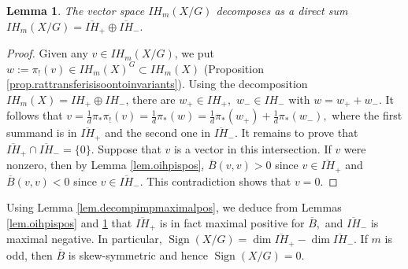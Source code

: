 \documentclass{amsart}
\newtheorem{lemma}[thm]{Lemma}
\theoremstyle{definition}
\theoremstyle{remark}
\newcommand {\Sign}    {{\ensuremath{\operatorname{Sign}}}}
\begin{document}
\begin{lemma} \label{lem.ihxmodgdecompoihpoihn}
The vector space $IH_m (X/G)$ decomposes as a direct sum
$IH_m (X/G) = \overline{IH}_+ \oplus \overline{IH}_-.$
\end{lemma}
\begin{proof}
Given any $v\in IH_m (X/G)$, we put
$w:= \pi_! (v) \in IH_m (X)^G \subset IH_m (X)$
(Proposition \ref{prop.rattransferisisoontoinvariants}).
Using the decomposition $IH_m (X) = IH_+ \oplus IH_-$,
there are $w_+ \in IH_+,$ $w_- \in IH_-$ with $w = w_+ + w_-$.
It follows that
$v = \frac{1}{d} \pi_* \pi_! (v)
     = \frac{1}{d} \pi_* (w)
     = \frac{1}{d} \pi_* (w_+) +  \frac{1}{d} \pi_* (w_-),$
where the first summand is in $\overline{IH}_+$ and the
second one in $\overline{IH}_-$.
It remains to prove that $\overline{IH}_+ \cap \overline{IH}_- = \{ 0\}.$
Suppose that $v$ is a vector in this intersection.
If $v$ were nonzero, then by Lemma \ref{lem.oihpispos},
$\overline{B} (v,v)>0$ since $v\in \overline{IH}_+$ and
$\overline{B} (v,v)<0$ since $v\in \overline{IH}_-$.
This contradiction shows that $v=0$.
\end{proof}

Using Lemma \ref{lem.decompimpmaximalpos},
we deduce from Lemmas \ref{lem.oihpispos} and \ref{lem.ihxmodgdecompoihpoihn} 
that $\overline{IH}_+$ is in fact maximal positive for $\overline{B},$
and $\overline{IH}_-$ is maximal negative.
In particular,
$\Sign (X/G) = \dim \overline{IH}_+ - \dim \overline{IH}_-.$
If $m$ is odd, then $\overline{B}$ is skew-symmetric
and hence $\Sign (X/G)=0$.
\end{document}
